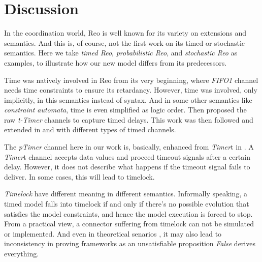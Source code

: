 \section{Discussion}
\label{sec:discussion}

In the coordination world, Reo is well known for its variety on extensions and semantics\cite{Jongmans2012}. And this is, of course, not the first work on its timed or stochastic semantics. Here we take \emph{timed Reo}, \emph{probabilistic Reo}, and \emph{stochastic Reo} as examples, to illustrate how our new model differs from its predecessors.

\vspace{0.5em}
 Time was natively involved in Reo from its very beginning\cite{ARBAB2004}, where \emph{FIFO1} channel needs time constraints to ensure its retardancy. However, time was involved, only implicitly, in this semantics instead of syntax. And in some other semantics like \emph{constraint automata}, time is even simplified as logic order. Then \cite{Arbab2006} proposed the raw \emph{t-Timer} channels to capture timed delays. This work was then followed and extended in \cite{Meng2007} and \cite{Meng2012} with different types of timed channels.

The \emph{pTimer} channel here in our work is, basically, enhanced from \emph{Timer}t in \cite{Meng2012}. A \emph{Timer}t channel accepts data values and proceed timeout signals after a certain delay. However, it does not describe what happens if the timeout signal fails to deliver. In some cases, this will lead to timelock.

\emph{Timelock} have different meaning in different semantics. Informally speaking, a timed model falls into timelock if and only if there's no possible evolution that satisfies the model constraints, and hence the model execution is forced to stop. From a practical view, a connector suffering from timelock can not be simulated or implemented. And even in theoretical senarios \cite{Li2015}, it may also lead to inconsistency in proving frameworks as an unsatisfiable proposition \emph{False} derives everything.


